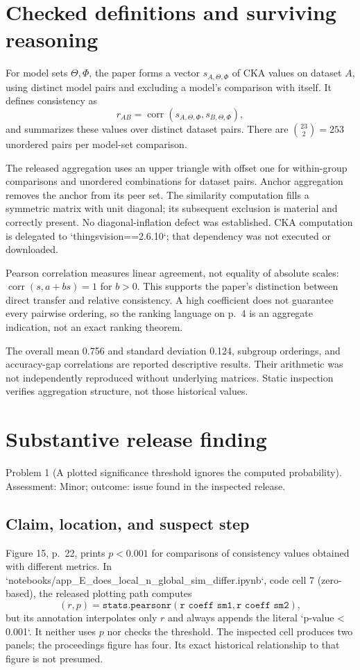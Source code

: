 \documentclass[10pt]{article}
\begin{document}
\section*{Checked definitions and surviving reasoning}
For model sets \(\Theta,\Phi\), the paper forms a vector \(s_{A,\Theta,\Phi}\) of CKA values on dataset \(A\), using distinct model pairs and excluding a model’s comparison with itself. It defines consistency as \[r_{AB}=\operatorname{corr}(s_{A,\Theta,\Phi},s_{B,\Theta,\Phi}),\] and summarizes these values over distinct dataset pairs. There are \(\binom{23}{2}=253\) unordered pairs per model-set comparison.\par
The released aggregation uses an upper triangle with offset one for within-group comparisons and unordered combinations for dataset pairs. Anchor aggregation removes the anchor from its peer set. The similarity computation fills a symmetric matrix with unit diagonal; its subsequent exclusion is material and correctly present. No diagonal-inflation defect was established. CKA computation is delegated to `thingsvision==2.6.10`; that dependency was not executed or downloaded.\par
Pearson correlation measures linear agreement, not equality of absolute scales: \(\operatorname{corr}(s,a+bs)=1\) for \(b>0\). This supports the paper’s distinction between direct transfer and relative consistency. A high coefficient does not guarantee every pairwise ordering, so the ranking language on p. 4 is an aggregate indication, not an exact ranking theorem.\par
The overall mean 0.756 and standard deviation 0.124, subgroup orderings, and accuracy-gap correlations are reported descriptive results. Their arithmetic was not independently reproduced without underlying matrices. Static inspection verifies aggregation structure, not those historical values.\par
\section*{Substantive release finding}
Problem 1 (A plotted significance threshold ignores the computed probability).  Assessment: Minor; outcome: issue found in the inspected release.\par
\subsection*{Claim, location, and suspect step}
Figure 15, p. 22, prints \(p<0.001\) for comparisons of consistency values obtained with different metrics. In `notebooks/app\_E\_does\_local\_n\_global\_sim\_differ.ipynb`, code cell 7 (zero-based), the released plotting path computes \[(r,p)=\texttt{stats.pearsonr}(\texttt{r coeff sm1},\texttt{r coeff sm2}),\] but its annotation interpolates only \(r\) and always appends the literal `p-value < 0.001`. It neither uses \(p\) nor checks the threshold. The inspected cell produces two panels; the proceedings figure has four. Its exact historical relationship to that figure is not presumed.\par
\end{document}
